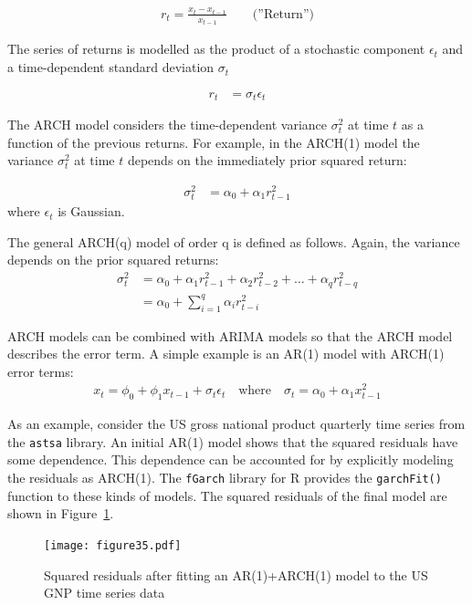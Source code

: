 \begin{align*}
r_t = \frac{x_t - x_{t-1}}{x_{t-1}} \qquad \text{(''Return'')}
\end{align*}

The series of returns is modelled as the product of a stochastic component $\epsilon_t$ and a time-dependent standard deviation $\sigma_t$

\begin{align*}
r_t &= \sigma_t \epsilon_t
\end{align*}

The ARCH model considers the time-dependent variance $\sigma_t^2$ at time $t$ as a function of the previous returns. For example, in the ARCH(1) model the variance $\sigma_t^2$ at time $t$ depends on the immediately prior squared return:

\begin{align*}
\sigma_t^2 &= \alpha_0 + \alpha_1 r_{t-1}^2
\end{align*}
\noindent where $\epsilon_t$ is Gaussian.

\begin{samepage}
The general ARCH(q) model of order q is defined as follows. Again, the variance depends on the prior squared returns:
\begin{align*}
\sigma_t^2 &= \alpha_0 + \alpha_1 r_{t-1}^2 + \alpha_2 r_{t-2}^2 + \ldots + \alpha_q r_{t-q}^2 \\
           &= \alpha_0 + \sum_{i=1}^q \alpha_i r_{t-i}^2
\end{align*}
\end{samepage}

ARCH models can be combined with ARIMA models so that the ARCH model describes the error term. A simple example is an AR(1) model with ARCH(1) error terms:
\begin{align*}
x_t = \phi_0 + \phi_1 x_{t-1} + \sigma_t \epsilon_t \quad \text{where} \quad \sigma_t = \alpha_0 + \alpha_1 x_{t-1}^2
\end{align*} 

As an example, consider the US gross national product quarterly time series from the \texttt{astsa} library. An initial AR(1) model shows that the squared residuals have some dependence. This dependence can be accounted for by explicitly modeling the residuals as ARCH(1). The \texttt{fGarch} library for R provides the \texttt{garchFit()} function to these kinds of models. The squared residuals of the final model are shown in Figure~\ref{fig:figure35}.

\begin{figure}
\centering
\centering
\texttt{[image: figure35.pdf]}
\caption[Squared residuals after fitting an AR(1)+ARCH(1) model]{Squared residuals after fitting an AR(1)+ARCH(1) model to the US GNP time series data}
\label{fig:figure35}
\end{figure}

